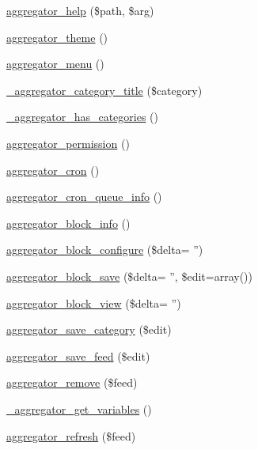 \begin{DoxyCompactItemize}
\item 
\hyperlink{aggregator_8module_a1b16201821780d636825810bbab7c8b9}{aggregator\_\-help} (\$path, \$arg)
\item 
\hyperlink{aggregator_8module_afc032aa1293caac3cb41980616a65fc5}{aggregator\_\-theme} ()
\item 
\hyperlink{aggregator_8module_a18d55253ab5538426a4fc6d20b672dda}{aggregator\_\-menu} ()
\item 
\hyperlink{aggregator_8module_aafaeff2e2b30da641b78b2cac450d8b3}{\_\-aggregator\_\-category\_\-title} (\$category)
\item 
\hyperlink{aggregator_8module_a85bb1e676454db9d98ad212fe0323bd1}{\_\-aggregator\_\-has\_\-categories} ()
\item 
\hyperlink{aggregator_8module_a1cb2d5a4e95cc6f7e9ecba9859b86e71}{aggregator\_\-permission} ()
\item 
\hyperlink{aggregator_8module_adbe7d09140773c5485cda52dd03bdab5}{aggregator\_\-cron} ()
\item 
\hyperlink{aggregator_8module_a3090186480044070e50c5682806980ad}{aggregator\_\-cron\_\-queue\_\-info} ()
\item 
\hyperlink{aggregator_8module_a5655c78445ab9448ec41bce3148a88ec}{aggregator\_\-block\_\-info} ()
\item 
\hyperlink{aggregator_8module_a94a7b69367b6844d1e724fdc11b6093a}{aggregator\_\-block\_\-configure} (\$delta= '')
\item 
\hyperlink{aggregator_8module_a52bde45afbc3605fa4607d51978ab488}{aggregator\_\-block\_\-save} (\$delta= '', \$edit=array())
\item 
\hyperlink{aggregator_8module_aad90d37427f960f03e64ff1ac7baade9}{aggregator\_\-block\_\-view} (\$delta= '')
\item 
\hyperlink{aggregator_8module_ade5aa9b8b9e6a6cde175f93092c58d3d}{aggregator\_\-save\_\-category} (\$edit)
\item 
\hyperlink{aggregator_8module_a2e3fef9906b9317edfd98019d4190d15}{aggregator\_\-save\_\-feed} (\$edit)
\item 
\hyperlink{aggregator_8module_ad71e79c625070f7932dc55ca575cae3c}{aggregator\_\-remove} (\$feed)
\item 
\hyperlink{aggregator_8module_af7655d9bd4e74cb36466d65001547a3f}{\_\-aggregator\_\-get\_\-variables} ()
\item 
\hyperlink{aggregator_8module_ac33f2d56e676554c7f10a56b05c646f7}{aggregator\_\-refresh} (\$feed)
\item 

\end{DoxyCompactItemize}
